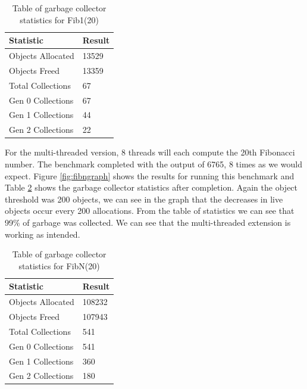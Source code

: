 \documentclass[../diss.tex]{subfiles}
\begin{document}
\begin{table}
    \centering
    \begin{tabular}{| l | l |}
        \hline
         \bf{Statistic} & \bf{Result} \\ \hline
         Objects Allocated & 13529 \\ \hline
         Objects Freed & 13359 \\ \hline
         Total Collections & 67 \\ \hline
         Gen 0 Collections & 67 \\ \hline
         Gen 1 Collections & 44 \\ \hline
         Gen 2 Collections & 22 \\ \hline
    \end{tabular}
    \caption{Table of garbage collector statistics for Fib1(20)}
    \label{tab:fib1stats}
\end{table}

For the multi-threaded version, 8 threads will each compute the 20th Fibonacci number. The benchmark completed with the output of 6765, 8 times as we would expect. Figure \ref{fig:fibngraph} shows the results for running this benchmark and Table \ref{tab:fibnstats} shows the garbage collector statistics after completion. Again the object threshold was 200 objects, we can see in the graph that the decreases in live objects occur every 200 allocations. From the table of statistics we can see that 99\% of garbage was collected. We can see that the multi-threaded extension is working as intended.

\begin{table}
    \centering
    \begin{tabular}{| l | l |}
        \hline
         \bf{Statistic} & \bf{Result} \\ \hline
         Objects Allocated & 108232 \\ \hline
         Objects Freed & 107943 \\ \hline
         Total Collections & 541 \\ \hline
         Gen 0 Collections & 541 \\ \hline
         Gen 1 Collections & 360 \\ \hline
         Gen 2 Collections & 180 \\ \hline
    \end{tabular}
    \caption{Table of garbage collector statistics for FibN(20)}
    \label{tab:fibnstats}
\end{table}
\end{document}
